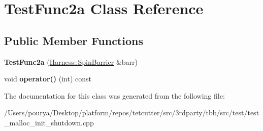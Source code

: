 \hypertarget{classTestFunc2a}{}\section{Test\+Func2a Class Reference}
\label{classTestFunc2a}
\subsection*{Public Member Functions}
\begin{DoxyCompactItemize}
\item 
\hypertarget{classTestFunc2a_af65dd39e5762730c775ccde121e063a1}{}{\bfseries Test\+Func2a} (\hyperlink{classHarness_1_1SpinBarrier}{Harness\+::\+Spin\+Barrier} \&barr)\label{classTestFunc2a_af65dd39e5762730c775ccde121e063a1}

\item 
\hypertarget{classTestFunc2a_a5af5236f568e780fc9bd688d0ae6dbbd}{}void {\bfseries operator()} (int) const \label{classTestFunc2a_a5af5236f568e780fc9bd688d0ae6dbbd}

\end{DoxyCompactItemize}


The documentation for this class was generated from the following file\+:\begin{DoxyCompactItemize}
\item 
/\+Users/pourya/\+Desktop/platform/repos/tetcutter/src/3rdparty/tbb/src/test/test\+\_\+malloc\+\_\+init\+\_\+shutdown.\+cpp\end{DoxyCompactItemize}
